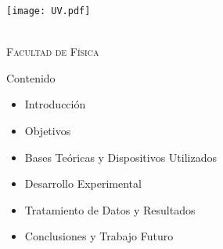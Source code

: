 \documentclass[14pt]{beamer}
\begin{document}
\title{\fontsize{17}{0}}
\author[\null]{{\fontsize{12}{1}\selectfont José Alberto López López} \and \\ \vspace{.3cm} Asesor: Dr. Antonio Marín Hernández}%
\vspace{-1cm}


\begin{frame}
\fontsize{11pt}{1}\selectfont
\vskip 20pt
\texttt{[image: UV.pdf]} 
\begin{minipage}[c][10pt]{8.5cm}
\begin{center}
\fontsize{15}{0} \\ \vskip 6pt \scshape \fontsize{12}{0}\selectfont Facultad de Física
\end{center}
\end{minipage}
\titlepage
\end{frame}


\begin{frame}{Contenido}

\begin{itemize}
\item Introducción
\vskip 8pt
\item Objetivos
\vskip 8pt
\item Bases Teóricas y Dispositivos Utilizados
\vskip 8pt
\item Desarrollo Experimental
\vskip 8pt
\item Tratamiento de Datos y Resultados
\vskip 8pt
\item Conclusiones y Trabajo Futuro
\end{itemize}

\end{frame}
\end{document}
